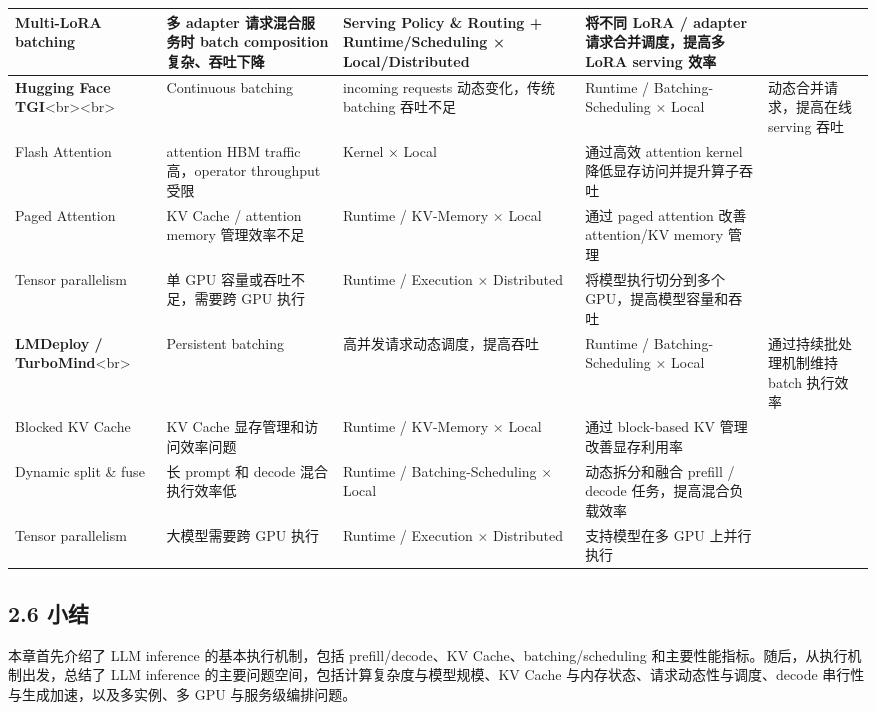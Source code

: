 \documentclass[a4paper,10pt]{ctexart}
\begin{document}
\begin{table}[H]
\begin{tabularx}{\textwidth}{|X|X|X|X|X|}
Multi-LoRA batching & 多 adapter 请求混合服务时 batch composition 复杂、吞吐下降 & Serving Policy \& Routing + Runtime/Scheduling × Local/Distributed & 将不同 LoRA / adapter 请求合并调度，提高多 LoRA serving 效率 &  \\ \hline
\textbf{Hugging Face TGI}<br><br> & Continuous batching & incoming requests 动态变化，传统 batching 吞吐不足 & Runtime / Batching-Scheduling × Local & 动态合并请求，提高在线 serving 吞吐 \\ \hline
Flash Attention & attention HBM traffic 高，operator throughput 受限 & Kernel × Local & 通过高效 attention kernel 降低显存访问并提升算子吞吐 &  \\ \hline
Paged Attention & KV Cache / attention memory 管理效率不足 & Runtime / KV-Memory × Local & 通过 paged attention 改善 attention/KV memory 管理 &  \\ \hline
Tensor parallelism & 单 GPU 容量或吞吐不足，需要跨 GPU 执行 & Runtime / Execution × Distributed & 将模型执行切分到多个 GPU，提高模型容量和吞吐 &  \\ \hline
\textbf{LMDeploy / TurboMind}<br> & Persistent batching & 高并发请求动态调度，提高吞吐 & Runtime / Batching-Scheduling × Local & 通过持续批处理机制维持 batch 执行效率 \\ \hline
Blocked KV Cache & KV Cache 显存管理和访问效率问题 & Runtime / KV-Memory × Local & 通过 block-based KV 管理改善显存利用率 &  \\ \hline
Dynamic split \& fuse & 长 prompt 和 decode 混合执行效率低 & Runtime / Batching-Scheduling × Local & 动态拆分和融合 prefill / decode 任务，提高混合负载效率 &  \\ \hline
Tensor parallelism & 大模型需要跨 GPU 执行 & Runtime / Execution × Distributed & 支持模型在多 GPU 上并行执行 &  \\ \hline
\end{tabularx}
\end{table}




\subsection*{2.6 小结}

本章首先介绍了 LLM inference 的基本执行机制，包括 prefill/decode、KV Cache、batching/scheduling 和主要性能指标。随后，从执行机制出发，总结了 LLM inference 的主要问题空间，包括计算复杂度与模型规模、KV Cache 与内存状态、请求动态性与调度、decode 串行性与生成加速，以及多实例、多 GPU 与服务级编排问题。
\end{document}
